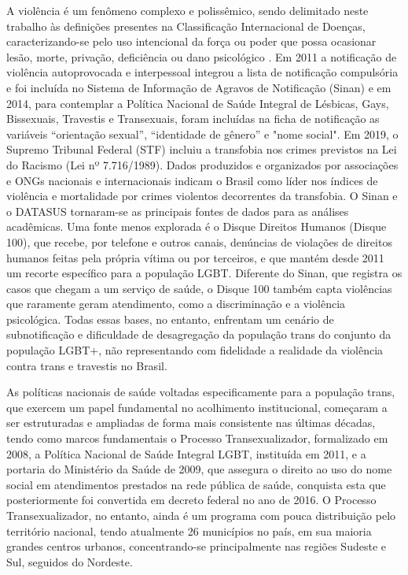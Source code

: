 \documentclass[12pt]{article}
\begin{document}
A violência é um fenômeno complexo e polissêmico, sendo delimitado neste trabalho às definições presentes na Classificação Internacional de Doenças, caracterizando-se pelo uso intencional da força ou poder que possa ocasionar lesão, morte, privação, deficiência ou dano psicológico \cite{marinho_tomazelli_firianelli:2024}. Em 2011 a notificação de violência autoprovocada e interpessoal integrou a lista de notificação compulsória e foi incluída no Sistema de Informação de Agravos de Notificação (Sinan) e em 2014, para contemplar a Política Nacional de Saúde Integral de Lésbicas, Gays, Bissexuais, Travestis e Transexuais, foram incluídas na ficha de notificação as variáveis “orientação sexual”, “identidade de gênero” e "nome social". Em 2019, o Supremo Tribunal Federal (STF) incluiu a transfobia nos crimes previstos na Lei do Racismo (Lei nº 7.716/1989). Dados produzidos e organizados por associações e ONGs nacionais e internacionais indicam o Brasil como líder nos índices de violência e mortalidade por crimes violentos decorrentes da transfobia. O Sinan e o DATASUS tornaram-se as principais fontes de dados para as análises acadêmicas. Uma fonte menos explorada é o Disque Direitos Humanos (Disque 100), que recebe, por telefone e outros canais, denúncias de violações de direitos humanos feitas pela própria vítima ou por terceiros, e que mantém desde 2011 um recorte específico para a população LGBT. Diferente do Sinan, que registra os casos que chegam a um serviço de saúde, o Disque 100 também capta violências que raramente geram atendimento, como a discriminação e a violência psicológica. Todas essas bases, no entanto, enfrentam um cenário de subnotificação e dificuldade de desagregação da população trans do conjunto da população LGBT+, não representando com fidelidade a realidade da violência contra trans e travestis no Brasil.

As políticas nacionais de saúde voltadas especificamente para a população trans, que exercem um papel fundamental no acolhimento institucional, começaram a ser estruturadas e ampliadas de forma mais consistente nas últimas décadas, tendo como marcos fundamentais o Processo Transexualizador, formalizado em 2008, a Política Nacional de Saúde Integral LGBT, instituída em 2011, e a portaria do Ministério da Saúde de 2009, que assegura o direito ao uso do nome social em atendimentos prestados na rede pública de saúde, conquista esta que posteriormente foi convertida em decreto federal no ano de 2016. O Processo Transexualizador, no entanto, ainda é um programa com pouca distribuição pelo território nacional, tendo atualmente 26 municípios no país, em sua maioria grandes centros urbanos, concentrando-se principalmente nas regiões Sudeste e Sul, seguidos do Nordeste.
\end{document}
